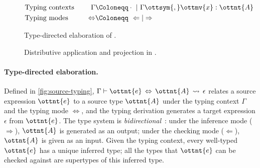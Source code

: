 \begin{figure}[t]
  \small
  \begin{align*}
    &\text{Typing contexts} &\quad\Gamma &\Coloneqq \cdot ~|~ \Gamma  \ottsym{,}  \ottmv{x}  :  \ottnt{A} \\
    &\text{Typing modes} &\quad\Leftrightarrow &\Coloneqq~  \Leftarrow  |  \Rightarrow  \\
  \end{align*}

  \ottdefnsElaboration

  \caption{Type-directed elaboration of \lambdaiplus.}
  \label{fig:source-typing}
\end{figure}

\begin{figure}[t]
  \small

  \ottdefnsDistributiveApplication
  \ottdefnsProjection

  \caption{Distributive application and projection in \lambdaiplus.}
  \label{fig:source-dist}
\end{figure}

\paragraph{Type-directed elaboration.}
Defined in \autoref{fig:source-typing}, $\Gamma  \vdash  \ottnt{e} \, \Leftrightarrow \, \ottnt{A}  \,\rightsquigarrow\,  \epsilon$ relates a
source expression $\ottnt{e}$ to a source type $\ottnt{A}$ under the typing context
$\Gamma$ and the typing mode $\Leftrightarrow$, and the typing derivation generates a
target expression $\epsilon$ from $\ottnt{e}$. The type system is
\emph{bidirectional}~\citep{pierce2000local,dunfield2021bidirectional}: under
the inference mode ($ \Rightarrow $), $\ottnt{A}$ is generated as an output; under the
checking mode ($ \Leftarrow $), $\ottnt{A}$ is given as an input. Given the typing
context, every well-typed $\ottnt{e}$ has a unique inferred type; all the types that
$\ottnt{e}$ can be checked against are supertypes of this inferred type.

